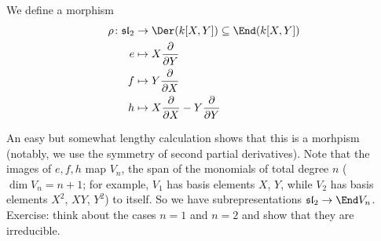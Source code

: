 We define a morphism
\begin{align*}
	\rho\colon \mathfrak{sl}_2&\to \Der(k[X, Y]) \subseteq \End(k[X, Y])\\
	e&\mapsto X\frac{\partial}{\partial Y}\\
	f&\mapsto Y\frac{\partial}{\partial X}\\
	h&\mapsto X\frac{\partial}{\partial X}-Y\frac{\partial}{\partial Y}
\end{align*}

An easy but somewhat lengthy calculation shows that this is a morhpism (notably,
we use the symmetry of second partial derivatives).
Note that the images of $e, f, h$ map
$V_n$, the span of the monomials of total degree $n$ ($\dim V_n = n + 1$; for example,
$V_1$ has basis elements $X$, $Y$, while $V_2$ has basis elements $X^2$, $XY$, $Y^2$)
to itself.
So we have subrepresentations $\mathfrak{sl}_2\to \End V_n$.
Exercise: think about the cases $n = 1$ and $n = 2$ and show that they are
irreducible.
